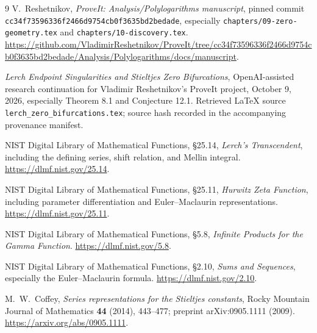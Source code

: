 \documentclass[11pt]{article}
\numberwithin{equation}{section}
\theoremstyle{definition}
\newcommand{\sha}{\texttt{cc34f73596336f2466d9754cb0f3635bd2bedade}}
\begin{document}
\begin{thebibliography}{9}
V.~Reshetnikov, \emph{ProveIt: Analysis/Polylogarithms manuscript},
pinned commit \sha, especially
\texttt{chapters/09-zero-geometry.tex} and \texttt{chapters/10-discovery.tex}.
\url{https://github.com/VladimirReshetnikov/ProveIt/tree/cc34f73596336f2466d9754cb0f3635bd2bedade/Analysis/Polylogarithms/docs/manuscript}.

\emph{Lerch Endpoint Singularities and Stieltjes Zero Bifurcations},
OpenAI-assisted research continuation for Vladimir Reshetnikov's ProveIt
project, October 9, 2026, especially Theorem 8.1 and Conjecture 12.1.
Retrieved LaTeX source \texttt{lerch\_zero\_bifurcations.tex}; source hash
recorded in the accompanying provenance manifest.

NIST Digital Library of Mathematical Functions, \S25.14,
\emph{Lerch's Transcendent}, including the defining series, shift relation,
and Mellin integral. \url{https://dlmf.nist.gov/25.14}.

NIST Digital Library of Mathematical Functions, \S25.11,
\emph{Hurwitz Zeta Function}, including parameter differentiation and
Euler--Maclaurin representations. \url{https://dlmf.nist.gov/25.11}.

NIST Digital Library of Mathematical Functions, \S5.8,
\emph{Infinite Products for the Gamma Function}.
\url{https://dlmf.nist.gov/5.8}.

NIST Digital Library of Mathematical Functions, \S2.10,
\emph{Sums and Sequences}, especially the Euler--Maclaurin formula.
\url{https://dlmf.nist.gov/2.10}.

M.~W.~Coffey, \emph{Series representations for the Stieltjes constants},
Rocky Mountain Journal of Mathematics \textbf{44} (2014), 443--477;
preprint arXiv:0905.1111 (2009).
\url{https://arxiv.org/abs/0905.1111}.
\end{thebibliography}
\end{document}
